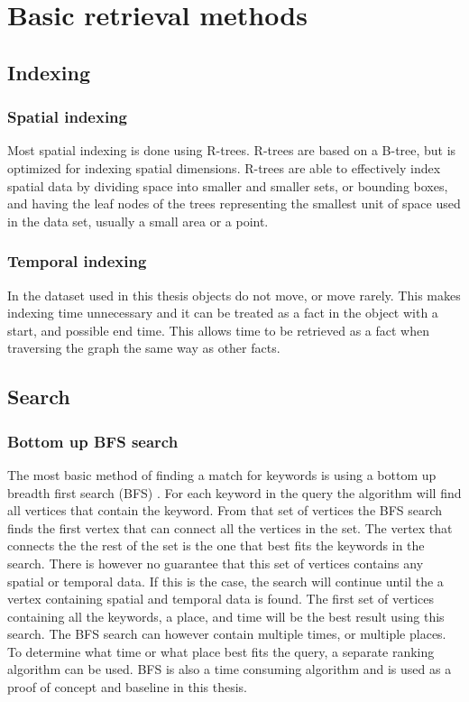 
\chapter{Basic retrieval methods}

\section{Indexing}

\subsection{Spatial indexing}
Most spatial indexing is done using R-trees. R-trees are based on a B-tree, but is optimized for indexing spatial dimensions. R-trees are able to effectively index spatial data by dividing space into smaller and smaller sets, or bounding boxes, and having the leaf nodes of the trees representing the smallest unit of space used in the data set, usually a small area or a point. 

\subsection{Temporal indexing}
In the dataset used in this thesis objects do not move, or move rarely. This makes indexing time unnecessary and it can be treated as a fact in the object with a start, and possible end time. This allows time to be retrieved as a fact when traversing the graph the same way as other facts.

\section{Search}
\subsection{Bottom up BFS search}
The most basic method of finding a match for keywords is using a bottom up breadth first search (BFS) \cite{He:2007:BRK:1247480.1247516}. For each keyword in the query the algorithm will find all vertices that contain the keyword. From that set of vertices the BFS search finds the first vertex that can connect all the vertices in the set. The vertex that connects the the rest of the set is the one that best fits the keywords in the search. There is however no guarantee that this set of vertices contains any spatial or temporal data. If this is the case, the search will continue until the a vertex containing spatial and temporal data is found. The first set of vertices containing all the keywords, a place, and time will be the best result using this search. The BFS search can however contain multiple times, or multiple places. To determine what time or what place best fits the query, a separate ranking algorithm can be used. BFS is also a time consuming algorithm and is used as a proof of concept and baseline in this thesis.

